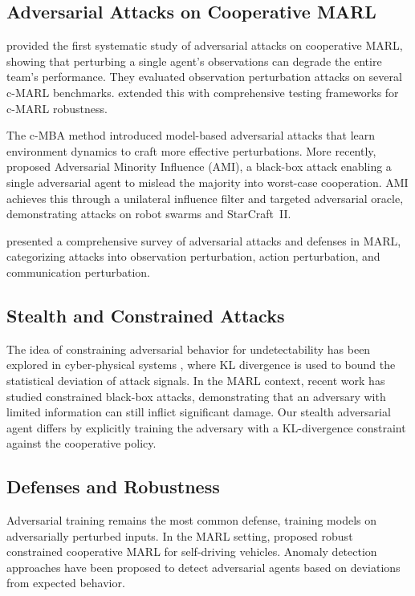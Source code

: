 \documentclass[12pt,a4paper]{article}
\begin{document}
\subsection{Adversarial Attacks on Cooperative MARL}

\citet{lin2020robustness} provided the first systematic study of adversarial attacks on cooperative MARL, showing that perturbing a single agent's observations can degrade the entire team's performance. They evaluated observation perturbation attacks on several c-MARL benchmarks. \citet{guo2022towards} extended this with comprehensive testing frameworks for c-MARL robustness.

The c-MBA method \citep{wu2022cmba} introduced model-based adversarial attacks that learn environment dynamics to craft more effective perturbations. More recently, \citet{li2025ami} proposed Adversarial Minority Influence (AMI), a black-box attack enabling a single adversarial agent to mislead the majority into worst-case cooperation. AMI achieves this through a unilateral influence filter and targeted adversarial oracle, demonstrating attacks on robot swarms and StarCraft~II.

\citet{standen2025acm} presented a comprehensive survey of adversarial attacks and defenses in MARL, categorizing attacks into observation perturbation, action perturbation, and communication perturbation.

\subsection{Stealth and Constrained Attacks}

The idea of constraining adversarial behavior for undetectability has been explored in cyber-physical systems \citep{kung2017optimal}, where KL divergence is used to bound the statistical deviation of attack signals. In the MARL context, recent work \citep{andam2025constrained} has studied constrained black-box attacks, demonstrating that an adversary with limited information can still inflict significant damage. Our stealth adversarial agent differs by explicitly training the adversary with a KL-divergence constraint against the cooperative policy.

\subsection{Defenses and Robustness}

Adversarial training \citep{madry2018towards} remains the most common defense, training models on adversarially perturbed inputs. In the MARL setting, \citet{wang2025robust} proposed robust constrained cooperative MARL for self-driving vehicles. Anomaly detection approaches \citep{kazari2023decentralized} have been proposed to detect adversarial agents based on deviations from expected behavior.
\end{document}
